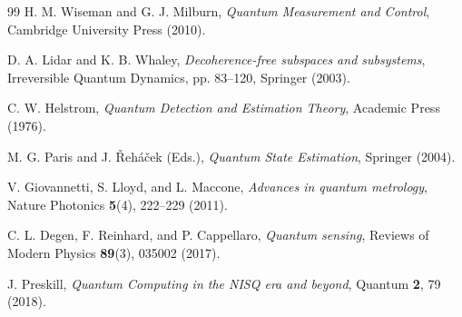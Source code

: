 \documentclass[12pt,a4paper]{article}
\begin{document}
\begin{thebibliography}{99}
H. M. Wiseman and G. J. Milburn,
\textit{Quantum Measurement and Control},
Cambridge University Press (2010).

D. A. Lidar and K. B. Whaley,
\textit{Decoherence-free subspaces and subsystems},
Irreversible Quantum Dynamics, pp. 83--120, Springer (2003).

C. W. Helstrom,
\textit{Quantum Detection and Estimation Theory},
Academic Press (1976).

M. G. Paris and J. Řeháček (Eds.),
\textit{Quantum State Estimation},
Springer (2004).

V. Giovannetti, S. Lloyd, and L. Maccone,
\textit{Advances in quantum metrology},
Nature Photonics \textbf{5}(4), 222--229 (2011).

C. L. Degen, F. Reinhard, and P. Cappellaro,
\textit{Quantum sensing},
Reviews of Modern Physics \textbf{89}(3), 035002 (2017).

J. Preskill,
\textit{Quantum Computing in the NISQ era and beyond},
Quantum \textbf{2}, 79 (2018).

\end{thebibliography}
\end{document}
